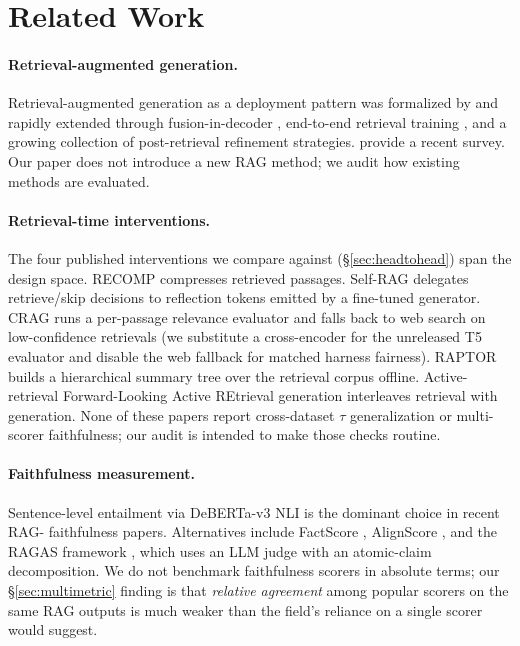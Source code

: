\section{Related Work}
\label{sec:related}

\paragraph{Retrieval-augmented generation.}
Retrieval-augmented generation as a deployment pattern was
formalized by \citet{lewis2020rag} and rapidly extended through
fusion-in-decoder \citep{izacard2020fid}, end-to-end retrieval
training \citep{sachan2021endtoend}, and a growing collection of
post-retrieval refinement strategies. \citet{gao2023rag} provide a
recent survey. Our paper does not introduce a new RAG method; we
audit how existing methods are evaluated.

\paragraph{Retrieval-time interventions.}
The four published interventions we compare against
(\S\ref{sec:headtohead}) span the design space.
RECOMP \citep{xu2023recomp} compresses retrieved passages.
Self-RAG \citep{asai2024selfrag} delegates retrieve/skip decisions
to reflection tokens emitted by a fine-tuned generator.
CRAG \citep{yan2024crag} runs a per-passage relevance evaluator and
falls back to web search on low-confidence retrievals
(we substitute a cross-encoder for the unreleased T5 evaluator and
disable the web fallback for matched harness fairness).
RAPTOR \citep{sarthi2024raptor} builds a hierarchical summary tree
over the retrieval corpus offline.
Active-retrieval Forward-Looking Active REtrieval generation
\citep{jiang2023active} interleaves retrieval with generation.
None of these papers report cross-dataset $\tau$ generalization or
multi-scorer faithfulness; our audit is intended to make those
checks routine.

\paragraph{Faithfulness measurement.}
Sentence-level entailment via DeBERTa-v3 NLI
\citep{he2021debertav3} is the dominant choice in recent RAG-
faithfulness papers. Alternatives include FactScore
\citep{min2023factscore}, AlignScore \citep{zha2023alignscore},
and the RAGAS framework \citep{shahul2024ragas}, which uses an LLM
judge with an atomic-claim decomposition. We do not benchmark
faithfulness scorers in absolute terms; our \S\ref{sec:multimetric}
finding is that \emph{relative agreement} among popular scorers on
the same RAG outputs is much weaker than the field's reliance on a
single scorer would suggest.

